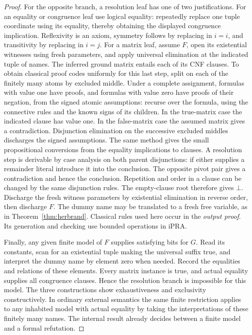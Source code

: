 \begin{proof}
For the opposite branch, a resolution leaf has one of two justifications. For an equality or congruence leaf use logical equality: repeatedly replace one tuple coordinate using its equality, thereby obtaining the displayed congruence implication. Reflexivity is an axiom, symmetry follows by replacing in $i=i$, and transitivity by replacing in $i=j$. For a matrix leaf, assume $F$, open its existential witnesses using fresh parameters, and apply universal elimination at the indicated tuple of names. The inferred ground matrix entails each of its CNF clauses. To obtain classical proof codes uniformly for this last step, split on each of the finitely many atoms by excluded middle. Under a complete assignment, formulas with value one have proofs, and formulas with value zero have proofs of their negation, from the signed atomic assumptions: recurse over the formula, using the connective rules and the known signs of its children. In the true-matrix case the indicated clause has value one. In the false-matrix case the assumed matrix gives a contradiction. Disjunction elimination on the successive excluded middles discharges the signed assumptions. The same method gives the small propositional conversions from the equality implications to clauses. A resolution step is derivable by case analysis on both parent disjunctions: if either supplies a remainder literal introduce it into the conclusion. The opposite pivot pair gives a contradiction and hence the conclusion. Repetition and order in a clause can be changed by the same disjunction rules. The empty-clause root therefore gives $\bot$. Discharge the fresh witness parameters by existential elimination in reverse order, then discharge $F$. The dummy name may be translated to a fresh free variable, as in Theorem~\ref{thm:herbrand}. Classical rules used here occur in the \emph{output proof}. Its generation and checking use bounded operations in iPRA.

Finally, any given finite model of $F$ supplies satisfying bits for $G$. Read its constants, scan for an existential tuple making the universal suffix true, and interpret the dummy name by element zero when needed. Record the equalities and relations of these elements. Every matrix instance is true, and actual equality supplies all congruence clauses. Hence the resolution branch is impossible for this model. The three constructions show exhaustiveness and exclusivity constructively. In ordinary external semantics the same finite restriction applies to any inhabited model with actual equality by taking the interpretations of these finitely many names. The internal result already decides between a finite model and a formal refutation.
\end{proof}


